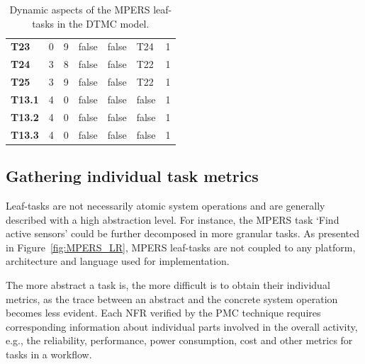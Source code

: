 \begin{table}[h]
{\begin{tabularx}{\textwidth}{@{}lllllll@{}}
\textbf{T23}   & 0                  & 9                  & false             & false                & T24                  & 1           \\
\textbf{T24}   & 3                  & 8                  & false             & false                & T22                  & 1           \\
\textbf{T25}   & 3                  & 9                  & false             & false                & T22                  & 1           \\
\textbf{T13.1} & 4                  & 0                  & false             & false                & false                & 1           \\
\textbf{T13.2} & 4                  & 0                  & false             & false                & false                & 1           \\
\textbf{T13.3} & 4                  & 0                  & false             & false                & false                & 1           \\ \bottomrule
\end{tabularx}
\caption{Dynamic aspects of the MPERS leaf-tasks in the DTMC model.}
\label{tab:MPERS_DTMC_SLOTS}
}
\end{table}


\subsection{Gathering individual task metrics}

Leaf-tasks are not necessarily atomic system operations and are generally described with a high abstraction level. For instance, the MPERS task `Find active sensors' could be further decomposed in more granular tasks. As presented in Figure~\ref{fig:MPERS_LR}, MPERS leaf-tasks are not coupled to any platform, architecture and language used for implementation.


The more abstract a task is, the more difficult is to obtain their individual metrics, as the trace between an abstract and the concrete system operation becomes less evident. Each NFR verified by the PMC technique requires corresponding information about individual parts involved in the overall activity, e.g., the reliability, performance, power consumption, cost and other metrics for tasks in a workflow.

